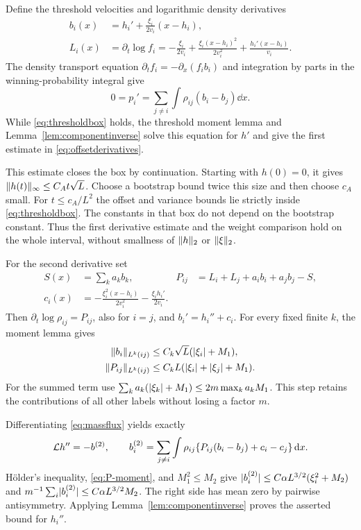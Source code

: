 Define the threshold velocities and logarithmic density derivatives
\begin{align}
 b_i(x)&=h_i'+\frac{\xi_i}{2v_i}(x-h_i),\label{eq:bvelocity}\\
 L_i(x)&=\partial_t\log f_i
   =-\frac{\xi_i}{2v_i}+\frac{\xi_i(x-h_i)^2}{2v_i^2}
                      +\frac{h_i'(x-h_i)}{v_i}.
 \label{eq:logdensity}
\end{align}
The density transport equation $\partial_t f_i=-\partial_x(f_ib_i)$
and integration by parts in the winning-probability integral give
\begin{equation}\label{eq:massflux}
             0=p_i'=\sum_{j\ne i}\int\rho_{ij}(b_i-b_j)\dd x.
\end{equation}
While \eqref{eq:thresholdbox} holds, the threshold moment lemma and
Lemma~\ref{lem:componentinverse} solve this equation for $h'$ and give
the first estimate in \eqref{eq:offsetderivatives}.

This estimate closes the box by continuation. Starting with $h(0)=0$,
it gives $\lVert h(t)\rVert_\infty\le C_A t\sqrt L$.
Choose a bootstrap bound twice this size and then choose $c_A$ small.
For $t\le c_A/L^2$ the offset and variance bounds lie strictly inside
\eqref{eq:thresholdbox}. The constants in that box do not depend on
the bootstrap constant. Thus the first derivative estimate and the
weight comparison hold on the whole interval, without smallness of
$\lVert h\rVert_2$ or $\lVert \xi\rVert_2$.

For the second derivative set
\begin{align}
 S(x)&=\sum_k a_kb_k,&
 P_{ij}&=L_i+L_j+a_ib_i+a_jb_j-S,\label{eq:Pij}\\
 c_i(x)&=-\frac{\xi_i^2(x-h_i)}{2v_i^2}
                       -\frac{\xi_ih_i'}{2v_i}.
\end{align}
Then $\partial_t\log\rho_{ij}=P_{ij}$, also for $i=j$, and
$b_i'=h_i''+c_i$. For every fixed finite $k$, the moment lemma gives
\begin{align}
 \lVert b_i\rVert_{L^k(ij)}&\le C_k\sqrt L(\lvert \xi_i\rvert+M_1),\\
 \lVert P_{ij}\rVert_{L^k(ij)}&\le C_kL(\lvert \xi_i\rvert+\lvert \xi_j\rvert+M_1).
 \label{eq:P-moment}
\end{align}
For the summed term use
$\sum_k a_k(\lvert \xi_k\rvert+M_1)\le2m\max_k a_k M_1$.
This step retains the contributions of all other labels without losing
a factor $m$.

Differentiating \eqref{eq:massflux} yields exactly
\begin{equation}\label{eq:massacceleration}
 \mathcal L h''=-b^{(2)},\qquad
 b_i^{(2)}=\sum_{j\ne i}\int\rho_{ij}
           \{P_{ij}(b_i-b_j)+c_i-c_j\}\,\mathrm d x.
\end{equation}
H\"older's inequality, \eqref{eq:P-moment}, and $M_1^2\le M_2$ give
$\lvert b_i^{(2)}\rvert\le C\alpha L^{3/2}(\xi_i^2+M_2)$ and
$m^{-1}\sum_i\lvert b_i^{(2)}\rvert\le C\alpha L^{3/2}M_2$.
The right side has mean zero by pairwise antisymmetry. Applying
Lemma~\ref{lem:componentinverse} proves the asserted bound for $h_i''$.


